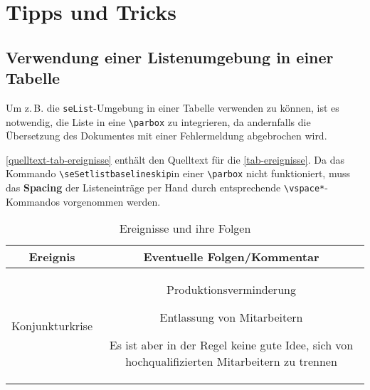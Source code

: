 \chapter{Tipps und Tricks}

\section{Verwendung einer Listenumgebung in einer Tabelle}

Um z.\,B. die \verb+seList+-Umgebung in einer Tabelle verwenden zu k\"onnen, ist es notwendig, die Liste 
in eine \verb+\parbox+ zu integrieren, da andernfalls die \"Ubersetzung des Dokumentes mit einer 
Fehlermeldung abgebrochen wird. 

\vref*{quelltext-tab-ereignisse} enth\"alt den Quelltext f\"ur die \vref{tab-ereignisse}. Da das Kommando 
\newline\hspace*{\fill}\verb+\seSetlistbaselineskip+\hspace*{\fill}\newline in einer 
\verb+\parbox+ nicht funktioniert, muss das \textbf{Spacing} der Listeneintr\"age per Hand durch entsprechende
\verb+\vspace*+-Kommandos vorgenommen werden.
 
\vspace{\baselineskip}
\begin{table}[htbp]
\centering
\begin{tabular}{| c | c |}
\hline
Ereignis & Eventuelle Folgen/Kommentar \\
\hline
Konjunkturkrise &
\parbox[t]{6cm}{%
\begin{seList}
\vspace*{-0.55\baselineskip}
\item Produktionsverminderung
\vspace*{-0.5\baselineskip}
\item Entlassung von Mitarbeitern
\vspace*{-0.5\baselineskip}
\item Es ist aber in der Regel keine gute Idee, sich von
hochqualifizierten Mitarbeitern zu trennen
\vspace*{0.25\baselineskip}
\end{seList}
} %
\\
\hline
\end{tabular}
\caption{Ereignisse und ihre Folgen\label{tab-ereignisse}}
\end{table} 
 

